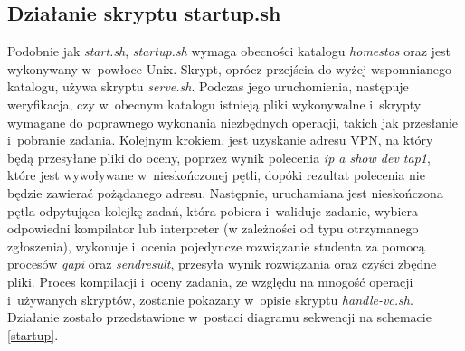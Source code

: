 \subsection{Działanie skryptu startup.sh}
Podobnie jak \textit{start.sh}, \textit{startup.sh} wymaga obecności katalogu \textit{\/home\/stos} oraz jest wykonywany w~powłoce Unix. Skrypt, oprócz przejścia do wyżej wspomnianego katalogu, używa skryptu \textit{serve.sh}. Podczas jego uruchomienia, następuje weryfikacja, czy w~obecnym katalogu istnieją pliki wykonywalne i~skrypty wymagane do poprawnego wykonania niezbędnych operacji, takich jak przesłanie i~pobranie zadania. Kolejnym krokiem, jest uzyskanie adresu VPN, na który będą przesyłane pliki do oceny, poprzez wynik polecenia \textit{ip a show dev tap1}\cite{ip_addr}, które jest wywoływane w~nieskończonej pętli, dopóki rezultat polecenia nie będzie zawierać pożądanego adresu. Następnie, uruchamiana jest nieskończona pętla odpytująca kolejkę zadań, która pobiera i~waliduje zadanie, wybiera odpowiedni kompilator lub interpreter (w zależności od typu otrzymanego zgłoszenia), wykonuje i~ocenia pojedyncze rozwiązanie studenta za pomocą procesów \textit{qapi} oraz \textit{sendresult}, przesyła wynik rozwiązania oraz czyści zbędne pliki. Proces kompilacji i~oceny zadania, ze względu na mnogość operacji i~używanych skryptów, zostanie pokazany w~opisie skryptu \textit{handle-vc.sh}. Działanie zostało przedstawione w~postaci diagramu sekwencji na schemacie \ref{startup}.
